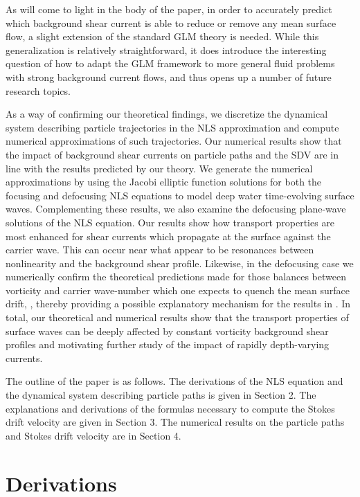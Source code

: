\documentclass{JFM_Style/jfm}
\begin{document}
As will come to light in the body of the paper, in order to accurately predict which background shear current is able to reduce or remove any mean surface flow, a slight extension of the standard GLM theory is needed.  While this generalization is relatively straightforward, it does introduce the interesting question of how to adapt the GLM framework to more general fluid problems with strong background current flows, and thus opens up a number of future research topics.

As a way of confirming our theoretical findings, we discretize the dynamical system describing particle trajectories in the NLS approximation and compute numerical approximations of such trajectories. Our numerical results show that the impact of background shear currents on particle paths and the SDV are in line with the results predicted by our theory. We generate the numerical approximations by using the Jacobi elliptic function solutions for both the focusing and defocusing NLS equations to model deep water time-evolving surface waves.  Complementing these results, we also examine the defocusing plane-wave solutions of the NLS equation.  Our results show how transport properties are most enhanced for shear currents which propagate at the surface against the carrier wave.  This can occur near what appear to be resonances between nonlinearity and the background shear profile.  Likewise, in the defocusing case we numerically confirm the theoretical predictions made for those balances between vorticity and carrier wave-number which one expects to quench the mean surface drift, , thereby providing a possible explanatory mechanism for the results in \cite{smith,breivik,monismith}.  In total, our theoretical and numerical results show that the transport properties of surface waves can be deeply affected by constant vorticity background shear profiles and motivating further study of the impact of rapidly depth-varying currents.  

The outline of the paper is as follows.  The derivations of the NLS equation and the dynamical system describing particle paths is given in Section 2.  The explanations and derivations of the formulas necessary to compute the Stokes drift velocity are given in Section 3.  The numerical results on the particle paths and Stokes drift velocity are in Section 4. 
\section{Derivations}
\end{document}
